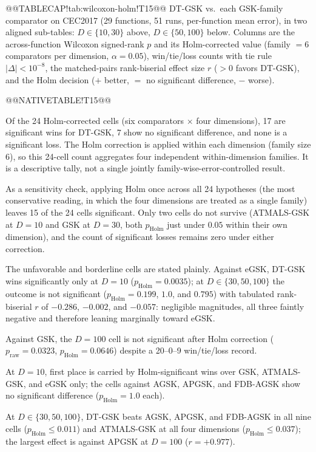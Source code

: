 \documentclass[10pt,a4paper]{article}
\newcommand{\dtgsk}{DT-GSK}
\newcommand{\atmals}{ATMALS-GSK}
\newcommand{\agsk}{AGSK}
\newcommand{\apgsk}{APGSK}
\newcommand{\fdbagsk}{FDB-AGSK}
\newcommand{\egsk}{eGSK}
\begin{document}
@@TABLECAP!tab:wilcoxon-holm!T15@@ \dtgsk{} vs.\ each GSK-family comparator on CEC2017 (29
functions, 51 runs, per-function mean error), in two aligned sub-tables:
$D \in \{10, 30\}$ above, $D \in \{50, 100\}$ below. Columns are the
across-function Wilcoxon signed-rank $p$ and its Holm-corrected value
(family $= 6$ comparators per dimension, $\alpha = 0.05$), win/tie/loss
counts with tie rule $|\Delta| < 10^{-8}$, the matched-pairs rank-biserial
effect size $r$ ($> 0$ favors \dtgsk{}), and the Holm decision ($+$ better,
$=$ no significant difference, $-$ worse).

@@NATIVETABLE!T15@@



Of the 24 Holm-corrected cells (six comparators $\times$ four
dimensions), 17 are significant wins for \dtgsk{}, 7 show no
significant difference, and none is a significant loss. The Holm correction is
applied within each dimension (family size 6), so this 24-cell count aggregates
four independent within-dimension families. It is a descriptive tally,
not a single jointly family-wise-error-controlled result.

As a sensitivity check, applying Holm once across all 24 hypotheses (the
most conservative reading, in which the four dimensions are treated as a
single family) leaves 15 of the 24 cells significant. Only two cells do
not survive (\atmals{} at $D = 10$ and GSK at $D = 30$, both
$p_{\mathrm{Holm}}$ just under $0.05$ within their own dimension), and the
count of significant losses remains zero under either correction.

The unfavorable and borderline cells are stated plainly. Against
\egsk{}, \dtgsk{} wins significantly only at $D = 10$
($p_{\mathrm{Holm}} = 0.0035$); at $D \in \{30, 50, 100\}$ the
outcome is not significant ($p_{\mathrm{Holm}} = 0.199$, $1.0$, and $0.795$)
with tabulated rank-biserial $r$ of $-0.286$, $-0.002$, and $-0.057$:
negligible magnitudes, all three faintly negative and therefore leaning
marginally toward \egsk{}.

Against GSK, the $D = 100$ cell is not significant after Holm correction
($p_{\mathrm{raw}} = 0.0323$, $p_{\mathrm{Holm}} = 0.0646$) despite a
20--0--9 win/tie/loss record.

At $D = 10$, first place is carried by Holm-significant wins over
GSK, \atmals{}, and \egsk{} only; the cells against \agsk{},
\apgsk{}, and \fdbagsk{} show no significant difference
($p_{\mathrm{Holm}} = 1.0$ each).

At $D \in \{30, 50, 100\}$, \dtgsk{} beats \agsk{}, \apgsk{}, and
\fdbagsk{} in all nine cells ($p_{\mathrm{Holm}} \leq 0.011$) and
\atmals{} at all four dimensions
($p_{\mathrm{Holm}} \leq 0.037$); the largest effect is against
\apgsk{} at $D = 100$ ($r = +0.977$).
\end{document}
